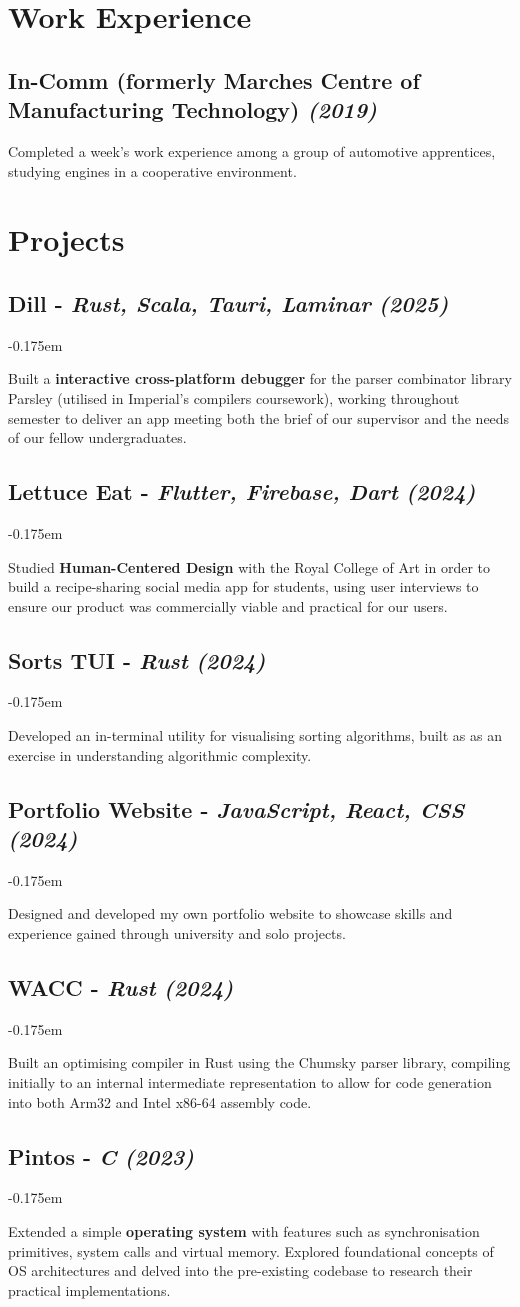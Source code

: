 \documentclass{article}
\newcommand{\dates}[1]{\hfill\textit{(#1)}}
\newcommand{\indentsubsection}[2]{
    \subsection*{#1}
    #2
}
\newcommand{\project}[4]{
    \indentsubsection{\textbf{#1} - \textit{#3} \dates{#2}}
    \vspace{-0.175em}
    \begin{minipage}{\dimexpr\textwidth - 2em}
        #4
    \end{minipage}    
    \hfill
    \vspace{-0.15em}
}
\begin{document}
\section*{Work Experience}

\indentsubsection{\textbf{In-Comm} (formerly Marches Centre of Manufacturing Technology) \dates{2019}}{
    \vspace{-0.175em}
    Completed a week's work experience among a group of automotive apprentices, studying engines in a cooperative environment.
}


\section*{Projects}

\project{Dill }{2025}{Rust, Scala, Tauri, Laminar}{
    Built a \textbf{interactive cross-platform debugger} for the parser combinator library Parsley (utilised in Imperial's compilers coursework), 
    working throughout semester to deliver an app meeting both the brief of our supervisor and the needs of our fellow undergraduates.
}

\project{Lettuce Eat }{2024}{Flutter, Firebase, Dart}{
    Studied \textbf{Human-Centered Design} with the Royal College of Art in order to build a recipe-sharing social media app for students,
    using user interviews to ensure our product was commercially viable and practical for our users.
}

\project{Sorts TUI}{2024}{Rust}{
    Developed an in-terminal utility for visualising sorting algorithms, built as as an exercise in understanding algorithmic complexity.
}

\project{Portfolio Website}{2024}{JavaScript, React, CSS}{
    Designed and developed my own portfolio website to showcase skills and experience gained through university and solo projects.
}

\project{WACC }{2024}{Rust}{
    Built an optimising compiler in Rust using the Chumsky parser library, compiling initially to an 
    internal intermediate representation to allow for code generation into both Arm32 and Intel x86-64 assembly code.
}

\project{Pintos }{2023}{C}{
    Extended a simple \textbf{operating system} with features such as synchronisation primitives, 
    system calls and virtual memory. Explored foundational concepts of OS architectures and delved into the
    pre-existing codebase to research their practical implementations. 
}
\end{document}
